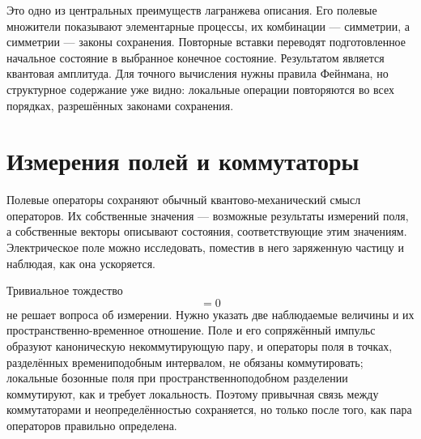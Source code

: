 Это одно из центральных преимуществ лагранжева описания. Его полевые множители показывают элементарные процессы, их комбинации — симметрии, а симметрии — законы сохранения. Повторные вставки переводят подготовленное начальное состояние в выбранное конечное состояние. Результатом является квантовая амплитуда. Для точного вычисления нужны правила Фейнмана, но структурное содержание уже видно: локальные операции повторяются во всех порядках, разрешённых законами сохранения.

\section{Измерения полей и коммутаторы}

Полевые операторы сохраняют обычный квантово-механический смысл операторов. Их собственные значения — возможные результаты измерений поля, а собственные векторы описывают состояния, соответствующие этим значениям. Электрическое поле можно исследовать, поместив в него заряженную частицу и наблюдая, как она ускоряется.

\begin{classroomqa}
\end{classroomqa}

Тривиальное тождество
\begin{equation}
[\phi(x),\phi(x)]=0
\end{equation}
не решает вопроса об измерении. Нужно указать две наблюдаемые величины и их пространственно-временное отношение. Поле и его сопряжённый импульс образуют каноническую некоммутирующую пару, и операторы поля в точках, разделённых времениподобным интервалом, не обязаны коммутировать; локальные бозонные поля при пространственноподобном разделении коммутируют, как и требует локальность. Поэтому привычная связь между коммутаторами и неопределённостью сохраняется, но только после того, как пара операторов правильно определена.

